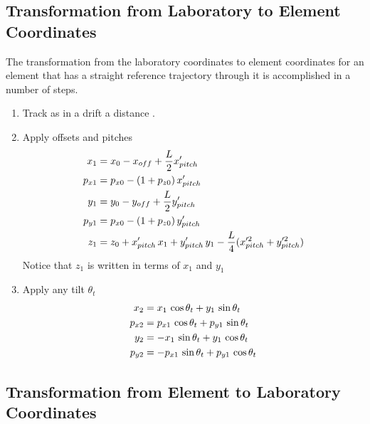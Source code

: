 \subsection{Transformation from Laboratory to Element Coordinates}

The transformation from the laboratory coordinates to
element coordinates for an element that has a
straight reference trajectory through it is accomplished in a number of steps.
\begin{enumerate}
\item
Track as in a drift a distance .
\item
Apply offsets and pitches
\begin{align}
  x_1    &= x_0 - x_{off} + \frac{L}{2} x'_{pitch} \nonumber \\
  p_{x1} &= p_{x0} - (1 + p_{z0}) \, x'_{pitch} \nonumber \\
  y_1    &= y_0 - y_{off} + \frac{L}{2} y'_{pitch} \\
  p_{y1} &= p_{x0} - (1 + p_{z0}) \, y'_{pitch} \nonumber \\
  z_1    &= z_0 + x'_{pitch} \, x_1 + y'_{pitch} \, y_1 - 
    \frac{L}{4} (x^{\prime2}_{pitch} + y^{\prime2}_{pitch}) \nonumber
\end{align}
Notice that $z_1$ is written in terms of $x_1$ and $y_1$
\item
Apply any tilt $\theta_t$
\begin{align}
  x_2    &=  x_1    \, \cos\theta_t + y_1    \, \sin\theta_t \nonumber \\
  p_{x2} &=  p_{x1} \, \cos\theta_t + p_{y1} \, \sin\theta_t \nonumber \\
  y_2    &= -x_1    \, \sin\theta_t + y_1    \, \cos\theta_t \\
  p_{y2} &= -p_{x1} \, \sin\theta_t + p_{y1} \, \cos\theta_t \nonumber
\end{align}
\end{enumerate}

\subsection{Transformation from Element to Laboratory Coordinates}


